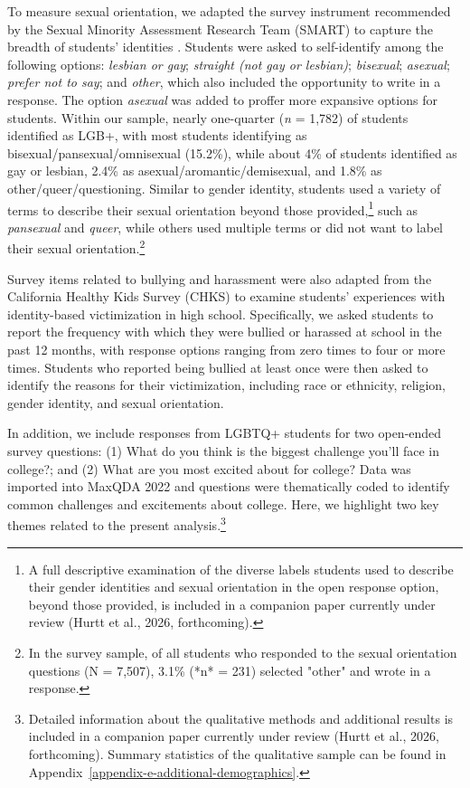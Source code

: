 To measure sexual orientation, we adapted the survey instrument
recommended by the Sexual Minority Assessment Research Team (SMART) to
capture the breadth of students' identities \citep{badgett2009a}.
Students were asked to self-identify among the following options:
\emph{lesbian or gay}; \emph{straight (not gay or lesbian)}; \emph{bisexual};
\emph{asexual}; \emph{prefer not to say}; and \emph{other}, which also included the
opportunity to write in a response. The option \emph{asexual} was added to
proffer more expansive options for students. Within our sample, nearly
one-quarter (\emph{n} = 1,782) of students identified as LGB+, with most
students identifying as bisexual/pansexual/omnisexual (15.2\%), while
about 4\% of students identified as gay or lesbian, 2.4\% as
asexual/aromantic/demisexual, and 1.8\% as other/queer/questioning.
Similar to gender identity, students used a variety of terms to describe
their sexual orientation beyond those provided,\footnote{A full descriptive examination of the diverse labels students used to describe their gender identities and sexual orientation in the open response option, beyond those provided, is included in a companion paper currently under review (Hurtt et al., 2026, forthcoming).} such as \emph{pansexual}
and \emph{queer}, while others used multiple terms or did not want to label
their sexual orientation.\footnote{In the survey sample, of all students who responded to the sexual orientation questions (N = 7,507), 3.1\% (*n* = 231) selected "other" and wrote in a response.}

Survey items related to bullying and harassment were also adapted from
the California Healthy Kids Survey (CHKS) \citep{austin2023a} to
examine students' experiences with identity-based victimization in high
school. Specifically, we asked students to report the frequency with
which they were bullied or harassed at school in the past 12 months,
with response options ranging from zero times to four or more times.
Students who reported being bullied at least once were then asked to
identify the reasons for their victimization, including race or
ethnicity, religion, gender identity, and sexual orientation.

In addition, we include responses from LGBTQ+ students for two
open-ended survey questions: (1) What do you think is the biggest
challenge you'll face in college?; and (2) What are you most excited
about for college? Data was imported into MaxQDA 2022 and questions were
thematically coded to identify common challenges and excitements about
college. Here, we highlight two key themes related to the present
analysis.\footnote{Detailed information about the qualitative methods and additional results is included in a companion paper currently under review (Hurtt et al., 2026, forthcoming). Summary statistics of the qualitative sample can be found in Appendix~\ref{appendix-e-additional-demographics}.}

